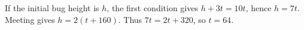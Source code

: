 If the initial bug height is $h$, the first condition gives $h+3t=10t$, hence $h=7t$. Meeting gives $h=2(t+160)$. Thus $7t=2t+320$, so $\boxed{t=64}$.
